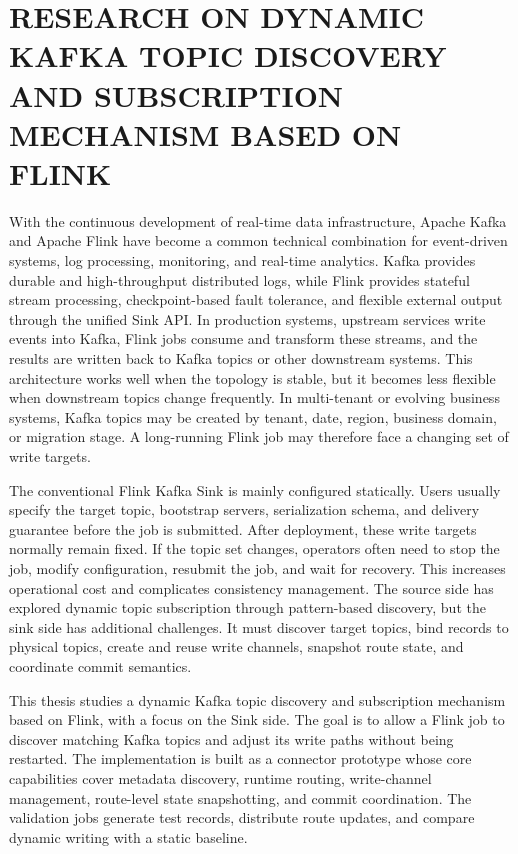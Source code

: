 
\chapter*{\MakeUppercase{RESEARCH ON DYNAMIC KAFKA TOPIC DISCOVERY AND SUBSCRIPTION MECHANISM BASED ON FLINK}}

With the continuous development of real-time data infrastructure, Apache Kafka and Apache Flink have become a common technical combination for event-driven systems, log processing, monitoring, and real-time analytics. Kafka provides durable and high-throughput distributed logs, while Flink provides stateful stream processing, checkpoint-based fault tolerance, and flexible external output through the unified Sink API. In production systems, upstream services write events into Kafka, Flink jobs consume and transform these streams, and the results are written back to Kafka topics or other downstream systems. This architecture works well when the topology is stable, but it becomes less flexible when downstream topics change frequently. In multi-tenant or evolving business systems, Kafka topics may be created by tenant, date, region, business domain, or migration stage. A long-running Flink job may therefore face a changing set of write targets.

The conventional Flink Kafka Sink is mainly configured statically. Users usually specify the target topic, bootstrap servers, serialization schema, and delivery guarantee before the job is submitted. After deployment, these write targets normally remain fixed. If the topic set changes, operators often need to stop the job, modify configuration, resubmit the job, and wait for recovery. This increases operational cost and complicates consistency management. The source side has explored dynamic topic subscription through pattern-based discovery, but the sink side has additional challenges. It must discover target topics, bind records to physical topics, create and reuse write channels, snapshot route state, and coordinate commit semantics.

This thesis studies a dynamic Kafka topic discovery and subscription mechanism based on Flink, with a focus on the Sink side. The goal is to allow a Flink job to discover matching Kafka topics and adjust its write paths without being restarted. The implementation is built as a connector prototype whose core capabilities cover metadata discovery, runtime routing, write-channel management, route-level state snapshotting, and commit coordination. The validation jobs generate test records, distribute route updates, and compare dynamic writing with a static baseline.

